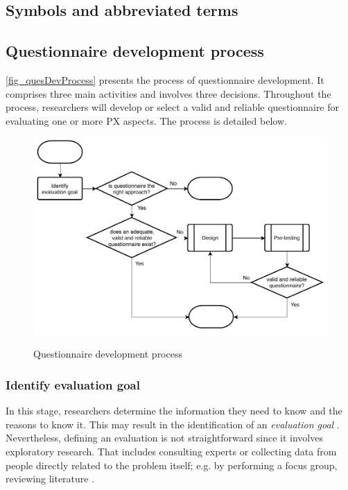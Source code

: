 \subsection{Symbols and abbreviated terms}
\begin{acronym}[UML]
\end{acronym}

\subsection{Questionnaire development process}

\autoref{fig_quesDevProcess} presents the process of questionnaire development. It comprises three main activities and involves three decisions. Throughout the process, researchers will develop or select a valid and reliable questionnaire for evaluating one or more \ac{PX} aspects. The process is detailed below.

\begin{figure}[htb]
\myfloatalign
{\includegraphics[width=0.9\linewidth]{gfx/standard/quesDevProcess}} \quad
\caption{Questionnaire development process}\label{fig_quesDevProcess}
\end{figure}

\subsubsection{Identify evaluation goal}
In this stage, researchers determine the information they need to know and the reasons to know it. This may result in the identification of an \emph{evaluation goal} \cite{Diem,Radhakrishna2007,Crawford1997}. Nevertheless, defining an evaluation is not straightforward since it involves exploratory research. That includes consulting experts or collecting data from people directly related to the problem itself; e.g. by performing a focus group, reviewing literature \cite{Crawford1997}.

